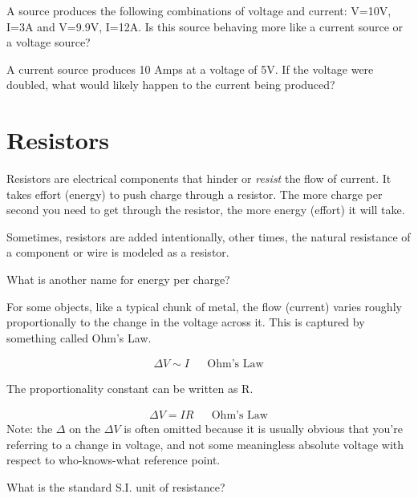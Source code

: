 \begin{alevel} A source produces the following combinations of voltage and current: {V=10V, I=3A} and  {V=9.9V, I=12A}. Is this source behaving more like a current source or a voltage source?
\end{alevel} 

\begin{blevel} A current source produces 10 Amps at a voltage of 5V. If the voltage were doubled, what would likely happen to the current being produced?
\end{blevel} 

\section{Resistors}
Resistors are electrical components that hinder or \emph{resist} the flow of current. It takes effort (energy) to push charge through a resistor. The more charge per second you need to get through the resistor, the more energy (effort) it will take.\par

Sometimes, resistors are added intentionally, other times, the natural resistance of a component or wire is modeled as a resistor.\par
\par
\begin{alevel}
What is another name for energy per charge?
\end{alevel}

For some objects, like a typical chunk of metal, the flow (current) varies roughly proportionally to the change in the voltage across it. This is captured by something called Ohm's Law.
\par
\begin{align*}
\Delta V \sim I	&&\text{Ohm's Law}
\end{align*}

The proportionality constant can be written as R.\par
\begin{align}
\Delta V = IR	&&\text{Ohm's Law}
\end{align}
 Note: the $\Delta$ on the $\Delta V$ is often omitted because it is usually obvious that you're referring to a change in voltage, and not some meaningless absolute voltage with respect to who-knows-what reference point. \par

\begin{alevel}
What is the standard S.I. unit of resistance?
\end{alevel}

